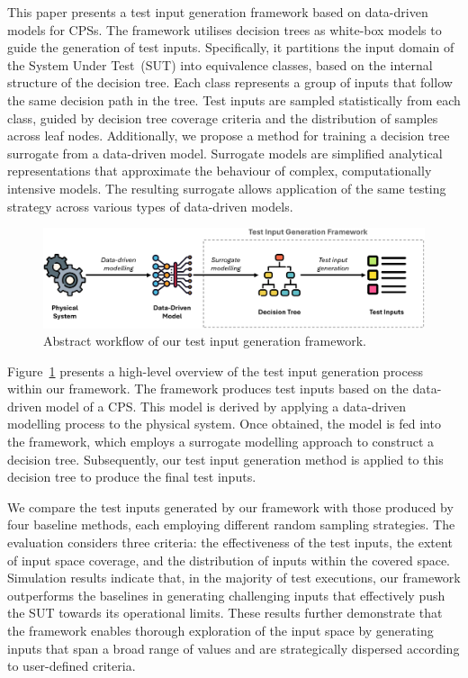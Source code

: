 \documentclass[
]{ceurart}
\theoremstyle{definition}
\begin{document}
This paper presents a test input generation framework based on data-driven models for CPSs. The framework utilises decision trees as white-box models to guide the generation of test inputs. Specifically, it partitions the input domain of the System Under Test~(SUT) into equivalence classes, based on the internal structure of the decision tree. Each class represents a group of inputs that follow the same decision path in the tree. Test inputs are sampled statistically from each class, guided by decision tree coverage criteria and the distribution of samples across leaf nodes. Additionally, we propose a method for training a decision tree surrogate from a data-driven model. Surrogate models are simplified analytical representations that approximate the behaviour of complex, computationally intensive models. The resulting surrogate allows application of the same testing strategy across various types of data-driven models.

\begin{figure}
\centering
\includegraphics[width=\linewidth]{img/abstract}
\caption{Abstract workflow of our test input generation framework.}
\label{fig:abstract}
\end{figure}

Figure~\ref{fig:abstract} presents a high-level overview of the test input generation process within our framework. The framework produces test inputs based on the data-driven model of a CPS. This model is derived by applying a data-driven modelling process to the physical system. Once obtained, the model is fed into the framework, which employs a surrogate modelling approach to construct a decision tree. Subsequently, our test input generation method is applied to this decision tree to produce the final test inputs.

We compare the test inputs generated by our framework with those produced by four baseline methods, each employing different random sampling strategies. The evaluation considers three criteria: the effectiveness of the test inputs, the extent of input space coverage, and the distribution of inputs within the covered space. Simulation results indicate that, in the majority of test executions, our framework outperforms the baselines in generating challenging inputs that effectively push the SUT towards its operational limits. These results further demonstrate that the framework enables thorough exploration of the input space by generating inputs that span a broad range of values and are strategically dispersed according to user-defined criteria.
\end{document}
